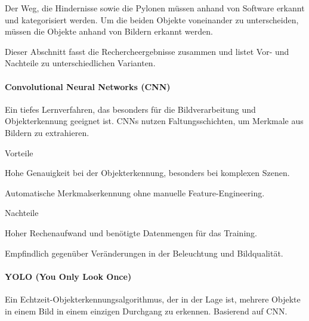 \documentclass[../main.tex]{subfiles}
\begin{document}
Der Weg, die Hindernisse sowie die Pylonen müssen anhand von Software erkannt und kategorisiert werden. Um die beiden Objekte voneinander zu unterscheiden, müssen die Objekte anhand von Bildern erkannt werden.

Dieser Abschnitt fasst die Rechercheergebnisse zusammen und listet Vor- und Nachteile zu unterschiedlichen Varianten.

\paragraph{Convolutional Neural Networks (CNN)}

Ein tiefes Lernverfahren, das besonders für die Bildverarbeitung und Objekterkennung geeignet ist. CNNs nutzen Faltungsschichten, um Merkmale aus Bildern zu extrahieren.

\begin{minipage}[t]{0.48\textwidth}
\begin{items}
  \item [Vorteile]
  \item Hohe Genauigkeit bei der Objekterkennung, besonders bei komplexen Szenen.
  \item Automatische Merkmalserkennung ohne manuelle Feature-Engineering.
\end{items}
\end{minipage}
\hfill
\begin{minipage}[t]{0.48\textwidth}
\begin{items}
  \item [Nachteile]
  \item Hoher Rechenaufwand und benötigte Datenmengen für das Training.
  \item Empfindlich gegenüber Veränderungen in der Beleuchtung und Bildqualität.
\end{items}
\end{minipage}

\paragraph{YOLO (You Only Look Once)}

Ein Echtzeit-Objekterkennungsalgorithmus, der in der Lage ist, mehrere Objekte in einem Bild in einem einzigen Durchgang zu erkennen. Basierend auf CNN.
\end{document}
